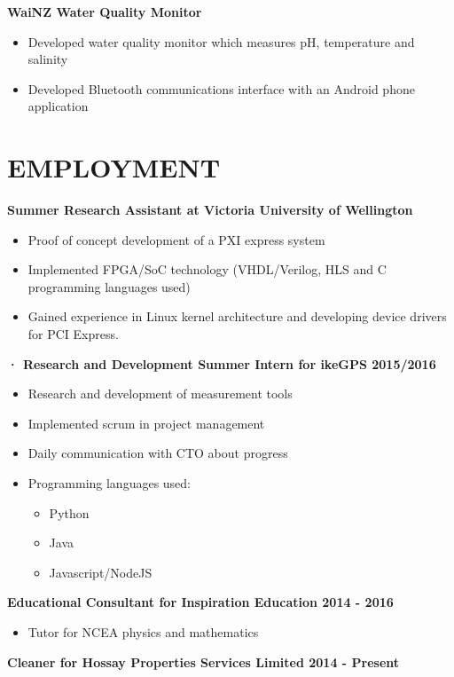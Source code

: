 \documentclass[3pt]{res}
\begin{document}
\begin{resume}
	{\bf WaiNZ Water Quality Monitor}
    \begin{itemize}[noitemsep] %
      \item Developed water quality monitor which measures pH, temperature and salinity 
      \item Developed Bluetooth communications interface with an Android phone application  
      \end{itemize}      
      
      


      
\section{EMPLOYMENT} 
\vspace{0.1in}
	 {\bf Summer Research Assistant at Victoria University of Wellington} 
    \begin{itemize}[noitemsep]
    	\item Proof of concept development of a PXI express system
    	\item Implemented FPGA/SoC technology (VHDL/Verilog, HLS and C programming languages used)
    	\item Gained experience in Linux kernel architecture and developing device drivers for PCI Express.
    \end{itemize} 
    {\bf ·	Research and Development Summer Intern for ikeGPS 2015/2016} 
    \begin{itemize}[noitemsep] %
      \item Research and development of measurement tools
      \item Implemented scrum in project management
      \item Daily communication with CTO about progress
      \item Programming languages used:
      \begin{itemize}
	    \item Python
	    \item Java
	    \item Javascript/NodeJS
	  \end{itemize}
      \end{itemize}
    {\bf Educational Consultant for Inspiration Education 2014 - 2016} 
    \begin{itemize}[noitemsep]
    	\item Tutor for NCEA physics and mathematics
    \end{itemize}
     {\bf Cleaner for Hossay Properties Services Limited 2014 - Present} 
   

\end{resume}
\end{document}
